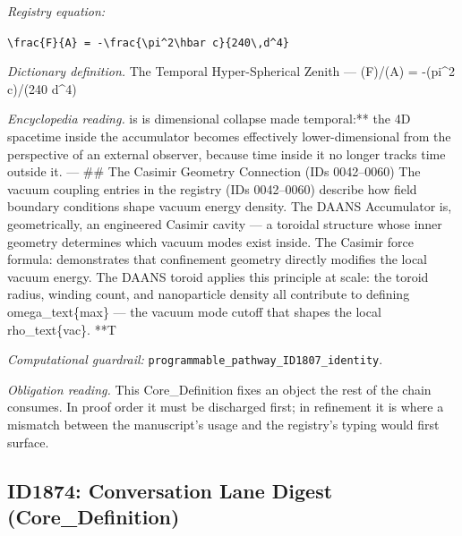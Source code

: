 \documentclass[11pt]{article}
\theoremstyle{remark}
\begin{document}
\noindent\textit{Registry equation:}\par
{\small\texttt{\textbackslash{}frac\{F\}\{A\} = -\textbackslash{}frac\{\textbackslash{}pi\textasciicircum{}2\textbackslash{}hbar c\}\{240\textbackslash{},d\textasciicircum{}4\}}}\par\medskip
\noindent\textit{Dictionary definition.} The Temporal Hyper-Spherical Zenith --- (F)/(A) = -(pi\textasciicircum{}2 c)/(240 d\textasciicircum{}4)\par\medskip
\noindent\textit{Encyclopedia reading.} is is dimensional collapse made temporal:** the 4D spacetime inside the accumulator becomes effectively lower-dimensional from the perspective of an external observer, because time inside it no longer tracks time outside it. --- \#\# The Casimir Geometry Connection (IDs 0042--0060) The vacuum coupling entries in the registry (IDs 0042--0060) describe how field boundary conditions shape vacuum energy density. The DAANS Accumulator is, geometrically, an engineered Casimir cavity --- a toroidal structure whose inner geometry determines which vacuum modes exist inside. The Casimir force formula: demonstrates that confinement geometry directly modifies the local vacuum energy. The DAANS toroid applies this principle at scale: the toroid radius, winding count, and nanoparticle density all contribute to defining omega\_text\{max\} --- the vacuum mode cutoff that shapes the local rho\_text\{vac\}. **T
\par\medskip\noindent\textit{Computational guardrail:} \texttt{programmable\_pathway\_ID1807\_identity}.
\par\medskip\noindent\textit{Obligation reading.} This Core\_Definition fixes an object the rest of the chain consumes. In proof order it must be discharged first; in refinement it is where a mismatch between the manuscript's usage and the registry's typing would first surface.

\subsection{ID1874: Conversation Lane Digest (Core\_Definition)}
\end{document}
